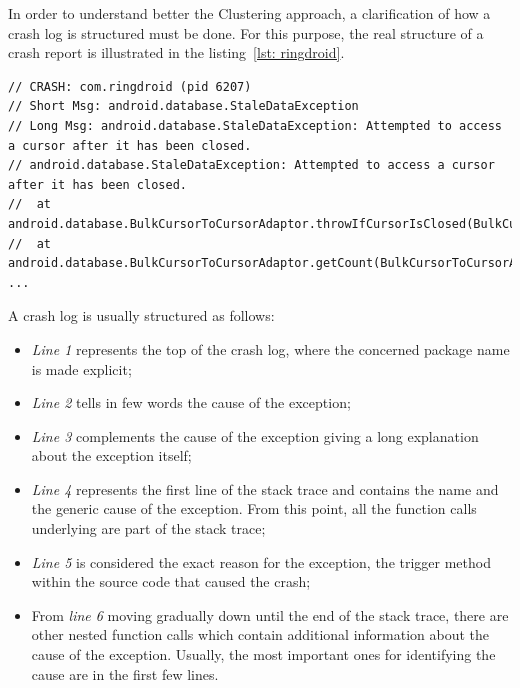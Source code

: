 In order to understand better the Clustering approach, a clarification of how a crash log is structured must be done. 
For this purpose, the real structure of a crash report is illustrated in the listing~\ref{lst: ringdroid}. 
\begin{lstlisting}[caption=Structure of a crash log, basicstyle=\fontsize{6}{8}\ttfamily,label={lst: ringdroid}]
// CRASH: com.ringdroid (pid 6207)
// Short Msg: android.database.StaleDataException
// Long Msg: android.database.StaleDataException: Attempted to access a cursor after it has been closed.
// android.database.StaleDataException: Attempted to access a cursor after it has been closed.
// 	at android.database.BulkCursorToCursorAdaptor.throwIfCursorIsClosed(BulkCursorToCursorAdaptor.java:64)
// 	at android.database.BulkCursorToCursorAdaptor.getCount(BulkCursorToCursorAdaptor.java:70)
...
\end{lstlisting}
A crash log is usually structured as follows: 
\begin{itemize}
\item \textit{Line 1} represents the top of the crash log, where the concerned package name is made explicit;
\item \textit{Line 2} tells in few words the cause of the exception; 
\item \textit{Line 3} complements the cause of the exception giving a long explanation about the exception itself;
\item \textit{Line 4} represents the first line of the stack trace and contains the name and the generic cause of the exception. 
From this point, all the function calls underlying are part of the stack trace;
\item \textit{Line 5} is considered the exact reason for the exception, \ie the trigger method within the source code that caused the crash;
\item From \textit{line 6} moving gradually down until the end of the stack trace, there are other nested function calls which contain additional information about the cause of the exception. Usually, the most important ones for identifying the cause are in the first few lines. 
\end{itemize}

